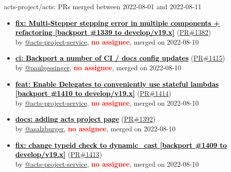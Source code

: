 \begin{frame}[allowframebreaks]{ acts-project/acts: PRs merged 
between 2022-08-01 and 2022-08-11
}
\begin{itemize}
    \item\prmerged
    \hspace*{0.1em}
    \textbf{\href{https://github.com/acts-project/acts/pull/1382}{\textcolor{black}{fix: Multi-Stepper stepping error in multiple components + refactoring [backport \#1339 to develop/v19.x]}}}
    (\href{https://github.com/acts-project/acts/pull/1382}{PR\#1382}) \\
    by \href{https://github.com/acts-project-service}{@acts-project-service}, {}\textbf{\textcolor{Red}{no assignee}}, merged on 2022-08-10

    \item\prmerged
    \hspace*{0.1em}
    \textbf{\href{https://github.com/acts-project/acts/pull/1415}{\textcolor{black}{ci: Backport a number of CI / docs config updates}}}
    (\href{https://github.com/acts-project/acts/pull/1415}{PR\#1415}) \\
    by \href{https://github.com/paulgessinger}{@paulgessinger}, {}\textbf{\textcolor{Red}{no assignee}}, merged on 2022-08-10

    \item\prmerged
    \hspace*{0.1em}
    \textbf{\href{https://github.com/acts-project/acts/pull/1414}{\textcolor{black}{feat: Enable Delegates to conveniently use stateful lambdas [backport \#1410 to develop/v19.x]}}}
    (\href{https://github.com/acts-project/acts/pull/1414}{PR\#1414}) \\
    by \href{https://github.com/acts-project-service}{@acts-project-service}, {}\textbf{\textcolor{Red}{no assignee}}, merged on 2022-08-10

    \item\prmerged
    \hspace*{0.1em}
    \textbf{\href{https://github.com/acts-project/acts/pull/1392}{\textcolor{black}{docs: adding acts project page}}}
    (\href{https://github.com/acts-project/acts/pull/1392}{PR\#1392}) \\
    by \href{https://github.com/asalzburger}{@asalzburger}, {}\textbf{\textcolor{Red}{no assignee}}, merged on 2022-08-10

    \item\prmerged
    \hspace*{0.1em}
    \textbf{\href{https://github.com/acts-project/acts/pull/1413}{\textcolor{black}{fix: change typeid check to dynamic\_cast [backport \#1409 to develop/v19.x]}}}
    (\href{https://github.com/acts-project/acts/pull/1413}{PR\#1413}) \\
    by \href{https://github.com/acts-project-service}{@acts-project-service}, {}\textbf{\textcolor{Red}{no assignee}}, merged on 2022-08-10


\end{itemize}
\end{frame}
